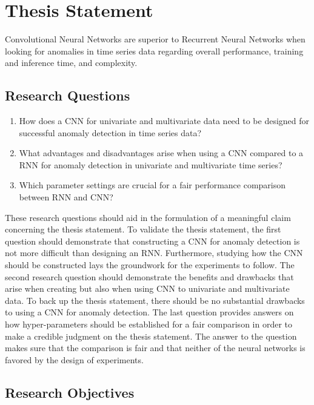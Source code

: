 \section{Thesis Statement} \label{thesisstatement}

Convolutional Neural Networks are superior to Recurrent Neural Networks when looking for anomalies in time series data regarding overall performance, training and inference time, and complexity.

\subsection{Research Questions} \label{research_questions}

\begin{enumerate}
	\item How does a CNN for univariate and multivariate data need to be designed for successful anomaly detection in time series data?
	\item What advantages and disadvantages arise when using a CNN compared to a RNN for anomaly detection in univariate and multivariate time series?
	\item Which parameter settings are crucial for a fair performance comparison between RNN and CNN? 
\end{enumerate}

These research questions should aid in the formulation of a meaningful claim concerning the thesis statement. To validate the thesis statement, the first question should demonstrate that constructing a CNN for anomaly detection is not more difficult than designing an RNN.
Furthermore, studying how the CNN should be constructed lays the groundwork for the experiments to follow. The second research question should demonstrate the benefits and drawbacks that arise when creating but also when using CNN to univariate and multivariate data. To back up the thesis statement, there should be no substantial drawbacks to using a CNN for anomaly detection. The last question provides answers on how hyper-parameters should be established for a fair comparison in order to make a credible judgment on the thesis statement.  The answer to the question makes sure that the comparison is fair and that neither of the neural networks is favored by the design of experiments. 


\clearpage 
\subsection{Research Objectives}

